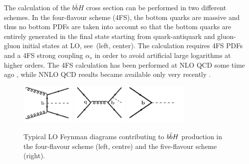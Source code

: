 \documentclass[11pt,a4paper]{article}
\begin{document}
The calculation of the $b\bar bH$ cross section can be performed in two different schemes. In the four-flavour scheme (4FS), the bottom quarks are massive and thus no bottom PDFs are taken into account so that the bottom quarks are entirely generated in the final state starting from quark-antiquark and gluon-gluon initial states at LO, see \,(left, center). The calculation requires 4FS PDFs and a 4FS strong coupling $\alpha_s$ in order to avoid artificial large logarithms at higher orders. The 4FS calculation has been performed at NLO QCD some time ago \cite{dittmaier:2003ej,dawson:2003kb}, while NNLO QCD results became available only very recently \cite{Biello:2024pgo}.
\begin{figure}[hbt]
\begin{center}
    \includegraphics[height=2cm]{./diags/gg-bbH.pdf}\hspace*{2cm}
    \includegraphics[height=2cm]{./diags/qq-bbH.pdf}\hspace*{2cm}
    \includegraphics[height=2cm]{./diags/bb-H.pdf}
	\vspace{0.2cm}
  \caption{Typical LO Feynman diagrams contributing to $b\bar{b}H$ production in
the four-flavour scheme (left, centre) and the five-flavour scheme (right).}
  \label{fig:bbhlo}
\end{center}
\end{figure}
\end{document}
